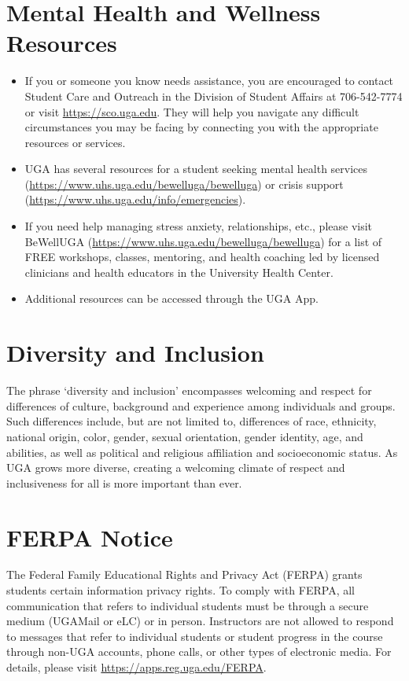 \documentclass[12pt]{article}
\begin{document}
\vspace{-2mm}
\section*{\normalsize Mental Health and Wellness Resources}
\vspace{-4mm}

\begin{itemize}
  \item If you or someone you know needs assistance, you are
    encouraged to contact Student Care and Outreach in the Division of
    Student Affairs at 706-542-7774 or visit \url{https://sco.uga.edu}. They
    will help you navigate any difficult circumstances you may be facing
    by connecting you with the appropriate resources or services.
  \item UGA has several resources for a student seeking mental health
    services (\url{https://www.uhs.uga.edu/bewelluga/bewelluga}) or crisis
    support (\url{https://www.uhs.uga.edu/info/emergencies}).
  \item If you need help managing stress anxiety, relationships, etc.,
    please visit BeWellUGA (\url{https://www.uhs.uga.edu/bewelluga/bewelluga})
    for a list of FREE workshops, classes, mentoring, and health
    coaching led by licensed clinicians and health educators in the
    University Health Center.
  \item Additional resources can be accessed through the UGA App.
\end{itemize}


\vspace{-2mm}
\section*{\normalsize Diversity and Inclusion}
\vspace{-4mm}
The phrase ‘diversity and inclusion’ encompasses welcoming and respect
for differences of culture, background and experience among
individuals and groups. Such differences include, but are not limited
to, differences of race, ethnicity, national origin, color, gender,
sexual orientation, gender identity, age, and abilities, as well as
political and religious affiliation and socioeconomic status. As UGA
grows more diverse, creating a welcoming climate of respect and
inclusiveness for all is more important than ever. 




\vspace{-2mm}
\section*{\normalsize FERPA Notice}
\vspace{-4mm}

The Federal Family Educational Rights and Privacy Act (FERPA) grants
students certain information privacy rights. To comply with FERPA, all
communication that refers to individual students must be through a
secure medium (UGAMail or eLC) or in person. Instructors are not
allowed to respond to messages that refer to individual students or
student progress in the course through non-UGA accounts, phone calls,
or other types of electronic media. For details, please visit
\url{https://apps.reg.uga.edu/FERPA}. 
\end{document}
